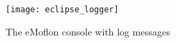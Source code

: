 \begin{itemize}
\begin{figure}[htbp]
	\centering
  \texttt{[image: eclipse\_logger]}
	\caption{The eMoflon console with log messages}
	\label{eclipse:logger}
\end{figure} 
\end{itemize}





